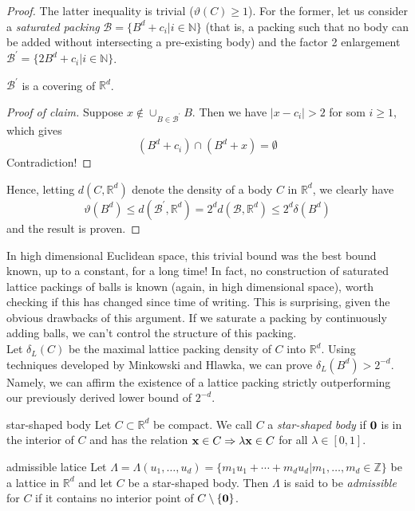 \documentclass{article}
\begin{document}
\begin{proof}
    The latter inequality is trivial ($\vartheta(C) \geq 1$). For the former, let us consider a {\it saturated 
    packing} $\mathcal{B} = \{B^d + c_i | i \in \mathbb{N}\}$ (that is, a packing such that 
    no body can be added without intersecting a pre-existing body) and the factor 2 enlargement 
    $\mathcal{B}^\prime = \{2B^d + c_i | i \in \mathbb{N}\}$.
    \begin{claim}
        $\mathcal{B}^\prime$ is a covering of $\mathbb{R}^d$.
    \end{claim}
    \begin{proof}[Proof of claim]
        Suppose $x \notin \cup_{B \in \mathcal{B}^\prime} B$. Then we have $\lvert x - c_i \rvert > 2$ for som $i \geq 1$, 
        which gives \[(B^d + c_i) \cap (B^d + x) = \emptyset\] Contradiction!
    \end{proof}
    Hence, letting $d(C, \mathbb{R}^d)$ denote the density of a body $C$ in $\mathbb{R}^d$, we clearly have 
    \[\vartheta(B^d) \leq d(\mathcal{B}^\prime, \mathbb{R}^d) = 2^d d(\mathcal{B}, \mathbb{R}^d) \leq 2^d \delta(B^d)\] 
    and the result is proven. 
\end{proof}

In high dimensional Euclidean space, this trivial bound was the best bound known, up to a constant, for a long 
time! In fact, no construction of saturated lattice packings of balls is known (again, in high dimensional space), worth 
checking if this has changed since time of writing. This is surprising, given the obvious drawbacks of this argument. 
If we saturate a packing by continuously adding balls, we can't control the structure of this packing. \\ 

Let $\delta_L(C)$ be the maximal lattice packing density of $C$ into $\mathbb{R}^d$. Using techniques developed by 
Minkowski and Hlawka, we can prove $\delta_L(B^d) > 2^{-d}$. Namely, we can affirm the existence of a lattice packing 
strictly outperforming our previously derived lower bound of $2^{-d}$.  

\begin{definition}[]{star-shaped body}
    Let $C \subset \mathbb{R}^d$ be compact. We call $C$ a {\it star-shaped body} if ${\bf 0}$ is in the interior 
    of $C$ and has the relation ${\bf x} \in C \Rightarrow \lambda {\bf x} \in C$ for all $\lambda \in [0, 1]$.
\end{definition}

\begin{definition}[]{admissible latice}
    Let $\Lambda = \Lambda(u_1, \dots, u_d) = \{m_1 u_1 + \cdots + m_d u_d | m_1, \dots, m_d \in \mathbb{Z}\}$ be a 
    lattice in $\mathbb{R}^d$ and let $C$ be a star-shaped body. Then $\Lambda$ is said to be {\it admissible} for 
    $C$ if it contains no interior point of $C\setminus \{{\bf 0}\}$.
\end{definition}
\end{document}
